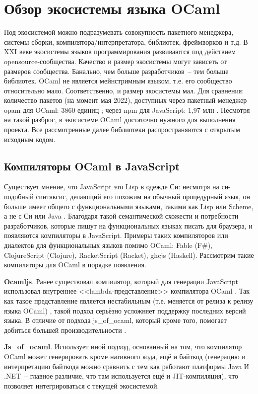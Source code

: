 \section{Обзор экосистемы языка OCaml}

Под экосистемой можно подразумевать совокупность пакетного менеджера, системы сборки, компилятора/интерпретатора, библиотек, фреймворков и т.д.
В XXI веке экосистемы языков программирования развиваются под действием opensource-сообщества.
Качество и размер экосистемы могут зависеть от размеров сообщества. Банально, чем больше разработчиков~-- тем больше библиотек.
OCaml не является мейнстримным языком, т.е. его сообщество относительно мало. Соответственно, и размер экосистемы мал.
Для сравнения: количество пакетов (на момент мая 2022),
доступных через пакетный менеджер opam для OCaml: 3860 единиц \cite{opam};
через npm для JavaScript: 1,97 млн \cite{npmjs}.
Несмотря на такой разброс, в экосистеме OCaml достаточно нужного для выполнения проекта.
Все рассмотренные далее библиотеки распространяются с открытым исходным кодом.

\subsection{Компиляторы OCaml в JavaScript}\label{jsoo}

Существует мнение, что JavaScript это Lisp в одежде Си:
несмотря на си-подобный синтаксис, делающий его похожим на обычный процедурный язык,
он больше имеет общего с функциональными языками, такими как Lisp или Scheme,
а не с Си или Java \cite{crockford}. Благодаря такой семантической схожести и
потребности разработчиков, которые пишут на функциональных языках писать для браузера,
и появляются компиляторы в JavaScript. Примеры таких компиляторов или диалектов для функциональных языков помимо OCaml:
Fable (F\#), ClojureScript (Clojure), RacketScript (Racket), ghcjs (Haskell).
Рассмотрим такие компиляторы для OCaml в порядке появления.

\textbf{Ocamljs}. Ранее существовал компилятор, который для генерации JavaScript
использовал внутреннее <<lambda-представление>> компилятора OCaml \cite{ocamljs-lambda}.
Так как такое представление является нестабильным (т.е. меняется от релиза к релизу языка OCaml) \cite{rwo-backend},
такой подход серьёзно усложняет поддержку последних версий языка. В отличие от подхода js\_of\_ocaml,
который кроме того,
помогает добиться большей производительности \cite[с.~13]{vouillon-jsoo}.

\textbf{Js\_of\_ocaml}. Использует иной подход, основанный на том, что компилятор OCaml
может генерировать кроме нативного кода, ещё и байткод
(генерацию и интерпретацию байткода можно сравнить с тем как работают платформы Java И .NET~--
главное различие, что там используется ещё и JIT-компиляция), что позволяет
интегрироваться с текущей экосистемой\cite[с.~1]{vouillon-jsoo}.

